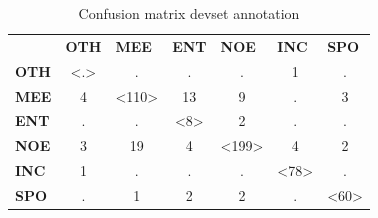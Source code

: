 \documentclass[
10pt, %
a4paper, %
oneside, %
headinclude,footinclude, %
BCOR5mm, %
]{scrartcl}
\begin{document}
\begin{table}[h]
\begin{tabular}{lcccccc}
                                  & \multicolumn{1}{l}{\textbf{OTH}}            & \multicolumn{1}{l}{\textbf{MEE}}              & \multicolumn{1}{l}{\textbf{ENT}}            & \multicolumn{1}{l}{\textbf{NOE}}              & \multicolumn{1}{l}{\textbf{INC}}             & \multicolumn{1}{l}{\textbf{SPO}}    \\ \cline{2-7} 
\multicolumn{1}{l|}{\textbf{OTH}} & \multicolumn{1}{c|}{\textless.\textgreater} & \multicolumn{1}{c|}{.}                        & \multicolumn{1}{c|}{.}                      & \multicolumn{1}{c|}{.}                        & \multicolumn{1}{c|}{1}                       & \multicolumn{1}{c|}{.}              \\ \cline{2-7} 
\multicolumn{1}{l|}{\textbf{MEE}} & \multicolumn{1}{c|}{4}                      & \multicolumn{1}{c|}{\textless110\textgreater} & \multicolumn{1}{c|}{13}                     & \multicolumn{1}{c|}{9}                        & \multicolumn{1}{c|}{.}                       & \multicolumn{1}{c|}{3}              \\ \cline{2-7} 
\multicolumn{1}{l|}{\textbf{ENT}} & \multicolumn{1}{c|}{.}                      & \multicolumn{1}{c|}{.}                        & \multicolumn{1}{c|}{\textless8\textgreater} & \multicolumn{1}{c|}{2}                        & \multicolumn{1}{c|}{.}                       & \multicolumn{1}{c|}{.}              \\ \cline{2-7} 
\multicolumn{1}{l|}{\textbf{NOE}} & \multicolumn{1}{c|}{3}                      & \multicolumn{1}{c|}{19}                       & \multicolumn{1}{c|}{4}                      & \multicolumn{1}{c|}{\textless199\textgreater} & \multicolumn{1}{c|}{4}                       & \multicolumn{1}{c|}{2}              \\ \cline{2-7} 
\multicolumn{1}{l|}{\textbf{INC}} & \multicolumn{1}{c|}{1}                      & \multicolumn{1}{c|}{.}                        & \multicolumn{1}{c|}{.}                      & \multicolumn{1}{c|}{.}                        & \multicolumn{1}{c|}{\textless78\textgreater} & \multicolumn{1}{c|}{.}              \\ \cline{2-7} 
\multicolumn{1}{l|}{\textbf{SPO}} & \multicolumn{1}{c|}{.}                      & \multicolumn{1}{c|}{1}                        & \multicolumn{1}{c|}{2}                      & \multicolumn{1}{c|}{2}                        & \multicolumn{1}{c|}{.}                       & \multicolumn{1}{c|}{\textless60\textgreater} \\ \cline{2-7} 
\end{tabular}
\caption[Table caption text]{Confusion matrix devset annotation }
\end{table}
\end{document}
